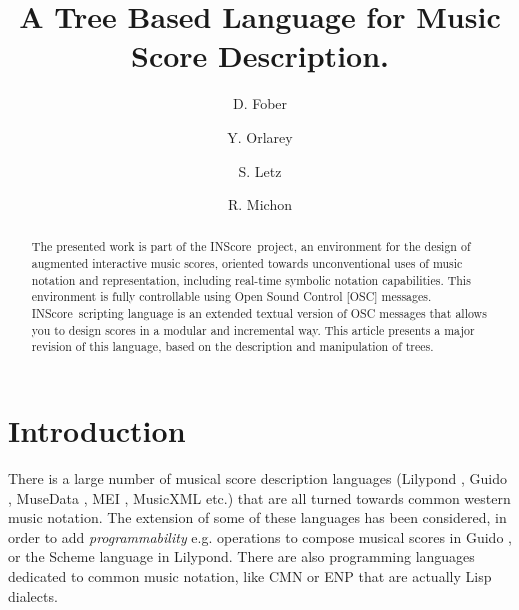 \documentclass[runningheads,a4paper]{llncs}
\newcommand{\IS}		{INScore}
\begin{document}
\title{A Tree Based Language for Music Score Description.}

\author{D. Fober \and
Y. Orlarey \and
S. Letz \and R. Michon}
%
%


\maketitle

%
\begin{abstract}
The presented work is part of the \IS\ project, an environment for the design of augmented interactive music scores, oriented towards unconventional uses of music notation and representation, including real-time symbolic notation capabilities. This environment is fully controllable using Open Sound Control [OSC] messages. \IS\ scripting language is an extended textual version of OSC messages that allows you to design scores in a modular and incremental way. This article presents a major revision of this language, based on the description and manipulation of trees.

\end{abstract}
%

\section{Introduction}\label{sec:introduction}

There is a large number of musical score description languages (Lilypond \cite{lilypond03}, Guido \cite{hoos98}, MuseData \cite{Hewlett97}, MEI \cite{Roland_2002}, MusicXML \cite{good01} etc.) that are all turned towards common western music notation. 
The extension of some of these languages has been considered, in order to add \textit{programmability} e.g. operations to compose musical scores in Guido \cite{fober12b}, or the Scheme language in Lilypond.
There are also programming languages dedicated to common music notation, like CMN \cite{Schottstaedt97} or ENP 
\cite{KUUSK06} that are actually Lisp dialects. %
\end{document}
